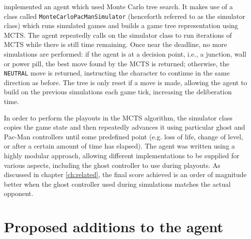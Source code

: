 \citet{Me2012} implemented an agent which used Monte Carlo tree search.  It makes use of a class called {\tt MonteCarloPacManSimulator} (henceforth referred to as the simulator class) which runs simulated games and builds a game tree representation using MCTS.  The agent repeatedly calls on the simulator class to run iterations of MCTS while there is still time remaining.  Once near the deadline, no more simulations are performed: if the agent is at a decision point, i.e., a junction, wall or power pill, the best move found by the MCTS is returned; otherwise, the {\tt NEUTRAL} move is returned, instructing the character to continue in the same direction as before.  The tree is only reset if a move is made, allowing the agent to build on the previous simulations each game tick, increasing the deliberation time.

In order to perform the playouts in the MCTS algorithm, the simulator class copies the game state and then repeatedly advances it using particular ghost and Pac-Man controllers until some predefined point (e.g. loss of life, change of level, or after a certain amount of time has elapsed).  The agent was written using a highly modular approach, allowing different implementations to be supplied for various aspects, including the ghost controller to use during playouts.  As discussed in chapter \ref{ch:related}, the final score achieved is an order of magnitude better when the ghost controller used during simulations matches the actual opponent.

\section{Proposed additions to the agent}
\label{sec:proposedadditions}

